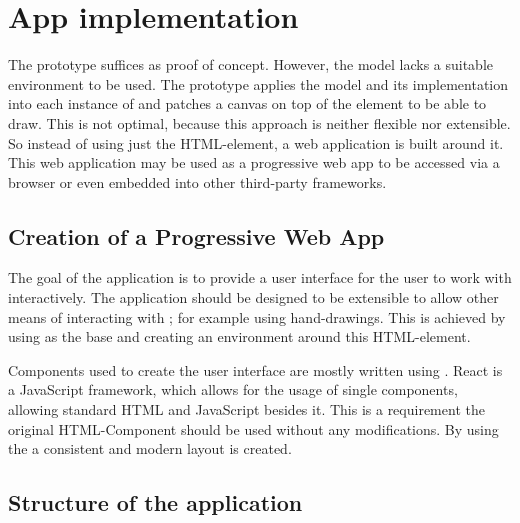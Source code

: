 \section{App implementation}\label{ch:app_implementation}

The prototype suffices as proof of concept.
However, the model lacks a suitable environment to be used.
The prototype applies the model and its implementation into each instance of  and patches a canvas on top of the element to be able to draw.
This is not optimal, because this approach is neither flexible nor extensible.
So instead of using just the  HTML-element, a web application is built around it.
This web application may be used as a progressive web app to be accessed via a browser or even embedded into other third-party frameworks.

\subsection{Creation of a Progressive Web App}

The goal of the application is to provide a user interface for the user to work with  interactively.
The application should be designed to be extensible to allow other means of interacting with ; for example using hand-drawings.
This is achieved by using  as the base and creating an environment around this HTML-element.

Components used to create the user interface are mostly written using . %
React is a JavaScript framework, which allows for the usage of single components, allowing standard HTML and JavaScript besides it.
This is a requirement the original  HTML-Component should be used without any modifications.
By using the \cite{MaterialUI2020} a consistent and modern layout is created.

\subsection{Structure of the application}

